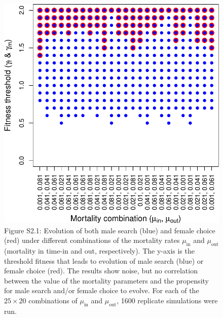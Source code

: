 \documentclass[
]{article}
\begin{document}
\begin{figure}
\centering
\includegraphics{SI_files/figure-latex/unnamed-chunk-2-1.pdf}
\caption{Figure S2.1: Evolution of both male search (blue) and female
choice (red) under different combinations of the mortality rates
\(\mu_{\mathrm{in}}\) and \(\mu_{\mathrm{out}}\) (mortality in time-in
and out, respectively). The y-axis is the threshold fitness that leads
to evolution of male search (blue) or female choice (red). The results
show noise, but no correlation between the value of the mortality
parameters and the propensity for male search and/or female choice to
evolve. For each of the \(25 \times 20\) combinations of
\(\mu_{\mathrm{in}}\) and \(\mu_{\mathrm{out}}\), 1600 replicate
simulations were run.}
\end{figure}

\captionsetup{labelformat=default}

\clearpage

\captionsetup{labelformat=empty}
\end{document}
